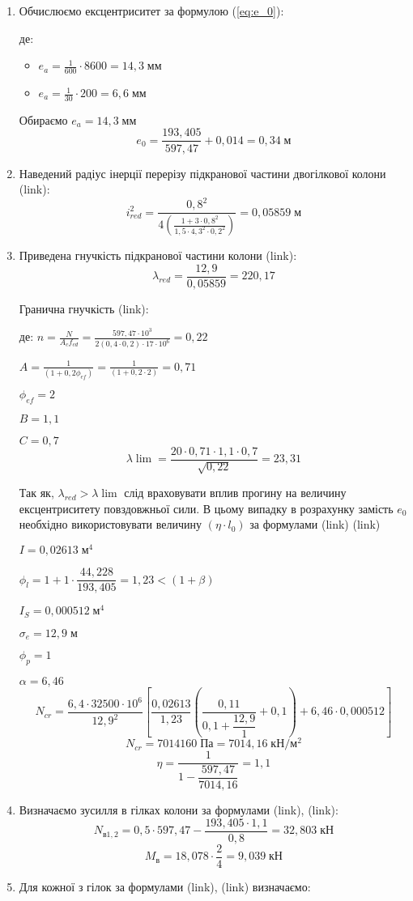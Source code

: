 \documentclass[a4paper,14pt]{article}
\begin{document}
\begin{enumerate}
    \item Обчислюємо ексцентриситет за формулою (\ref{eq:e_0}):
        
        де: \begin{itemize}
                \item $e_a = \frac{1}{600} \cdot 8600 = 14,3\;\textit{мм}$
                \item $e_a = \frac{1}{30} \cdot 200 = 6,6\;\textit{мм}$
            \end{itemize}
        Обираємо $e_a = 14,3\;\textit{мм}$
        $$e_0 = \frac{193,405}{597,47}+0,014 = 0,34\;\textit{м}$$
    \item Наведений радіус інерції перерізу підкранової частини двогілкової колони (link):  
        $$i_{red}^2 = \frac{0,8^2}{4(\frac{1+3 \cdot 0,8^2}{1,5 \cdot 4,3^2 \cdot 0,2^2})} = 0,05859\;\textit{м}$$
    \item Приведена гнучкість підкранової частини колони (link):
        $$\lambda_{red} = \frac{12,9}{0,05859} = 220,17$$
        
        Гранична гнучкість (link):

        де: $n = \frac{N}{A_cf_{cd}} = \frac{597,47 \cdot 10^3}{2(0,4 \cdot 0,2) \cdot 17 \cdot 10^6} = 0,22$

            $A = \frac{1}{(1+0,2\phi_{ef})} = \frac{1}{(1+0,2 \cdot 2)} = 0,71$

            $\phi_{ef} = 2$

            $B = 1,1$

            $C = 0,7$
            $$\lambda\lim = \frac{20 \cdot 0,71 \cdot 1,1 \cdot 0,7}{\sqrt{0,22}} = 23,31$$

        Так як, $\lambda_{red} > \lambda\lim$ слід враховувати вплив прогину на величину ексцентриситету повздовжньої сили. В цьому випадку в розрахунку замість $e_0$ необхідно використовувати
        величину $(\eta \cdot l_0)$ за формулами (link) (link)
        
        $I = 0,02613\;\textit{м}^4$

        $\phi_l = 1 + 1 \cdot \dfrac{44,228}{193,405} = 1,23 < (1 + \beta)$

        $I_S = 0,000512\;\textit{м}^4$

        $\sigma_e = 12,9\;\textit{м}$

        $\phi_p = 1$

        $\alpha = 6,46$
        $$N_{cr} = \frac{6,4 \cdot 32500 \cdot 10^6}{12,9^2}\left[\frac{0,02613}{1,23}\left(\frac{0,11}{0,1 + \dfrac{12,9}{1}} + 0,1\right) + 6,46 \cdot 0,000512\right]$$
        $$N_{cr} = 7014160\;\textit{Па} = 7014,16\;\textit{кН}/\textit{м}^2$$
        $$\eta = \dfrac{1}{1 - \dfrac{597,47}{7014,16}} = 1,1$$
    \item Визначаємо зусилля в гілках колони за формулами (link), (link):
        $$N_{\textit{в}1,2} = 0,5 \cdot 597,47 - \frac{193,405 \cdot 1,1}{0,8} = 32,803\;\textit{кН}$$
        $$M_\textit{в} = 18,078 \cdot \frac{2}{4} = 9,039\;\textit{кН}$$
    \item Для кожної з гілок за формулами (link), (link) визначаємо:


\end{enumerate}
\end{document}
